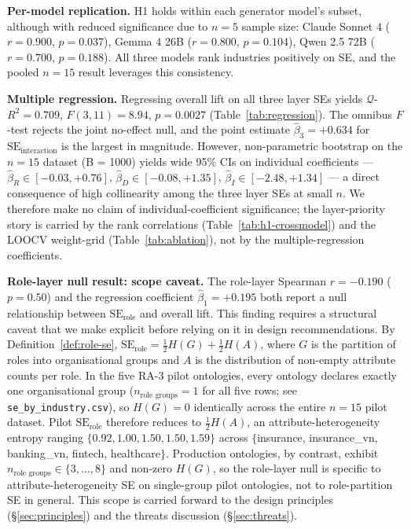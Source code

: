 \documentclass[11pt,a4paper]{article}
\newcommand{\se}{\mathrm{SE}}
\newcommand{\serole}{\se_{\text{role}}}
\newcommand{\seint}{\se_{\text{interaction}}}
\begin{document}
\textbf{Per-model replication.} H1 holds within each generator model's
subset, although with reduced significance due to $n=5$ sample size:
Claude Sonnet 4 ($r = 0.900$, $p = 0.037$), Gemma 4 26B ($r = 0.800$,
$p = 0.104$), Qwen 2.5 72B ($r = 0.700$, $p = 0.188$). All three models
rank industries positively on SE, and the pooled $n=15$ result leverages
this consistency.

\textbf{Multiple regression.} Regressing overall lift on all three layer
SEs yields $\mathcal{Q}$-$R^2 = 0.709$, $F(3, 11) = 8.94$, $p = 0.0027$
(Table~\ref{tab:regression}). The omnibus $F$-test rejects the joint
no-effect null, and the point estimate
$\hat{\beta}_3 = +0.634$ for $\seint$ is the largest in magnitude.
However, non-parametric bootstrap on the $n=15$ dataset (B = 1000)
yields wide 95\% CIs on individual coefficients --- $\hat{\beta}_R \in
[-0.03, +0.76]$, $\hat{\beta}_D \in [-0.08, +1.35]$, $\hat{\beta}_I
\in [-2.48, +1.34]$ --- a direct consequence of high collinearity
among the three layer SEs at small $n$. We therefore make no claim of
individual-coefficient significance; the layer-priority story is
carried by the rank correlations (Table~\ref{tab:h1-crossmodel}) and
the LOOCV weight-grid (Table~\ref{tab:ablation}), not by the
multiple-regression coefficients.

\textbf{Role-layer null result: scope caveat.} The role-layer Spearman
$r = -0.190$ ($p = 0.50$) and the regression coefficient
$\hat{\beta}_1 = +0.195$ both report a null relationship between
$\serole$ and overall lift. This finding requires a structural caveat
that we make explicit before relying on it in design recommendations.
By Definition~\ref{def:role-se}, $\serole = \frac{1}{2}H(G) +
\frac{1}{2}H(A)$, where $G$ is the partition of roles into
organisational groups and $A$ is the distribution of non-empty
attribute counts per role. In the five RA-3 pilot ontologies, every
ontology declares exactly one organisational group
($n_{\text{role groups}} = 1$ for all five rows; see
\texttt{se\_by\_industry.csv}), so $H(G) = 0$ identically across the
entire $n=15$ pilot dataset. Pilot $\serole$ therefore reduces to
$\frac{1}{2}H(A)$, an attribute-heterogeneity entropy ranging
$\{0.92, 1.00, 1.50, 1.50, 1.59\}$ across
$\{$insurance, insurance\_vn, banking\_vn, fintech, healthcare$\}$.
Production ontologies, by contrast, exhibit
$n_{\text{role groups}} \in \{3, \ldots, 8\}$ and non-zero $H(G)$,
so the role-layer null is specific to attribute-heterogeneity SE on
single-group pilot ontologies, not to role-partition SE in general.
This scope is carried forward to the design principles
(\S\ref{sec:principles}) and the threats discussion
(\S\ref{sec:threats}).
\end{document}
